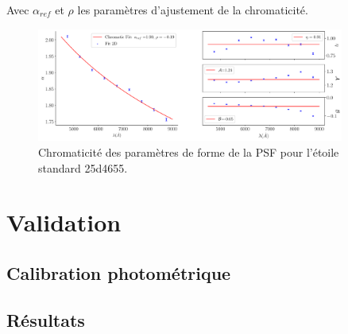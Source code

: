 \documentclass[../main/main.tex]{subfiles}
\begin{document}
Avec $\alpha_{ref}$ et $\rho$ les paramètres d'ajustement de la chromaticité.

\begin{figure}
  \centering
  \includegraphics[width=0.9\textwidth]{../figures/06_irf/chromaticity_psf.pdf}
  \caption[Chromaticité des paramètres de forme de la PSF]{Chromaticité
    des paramètres de forme de la PSF pour l'étoile standard 25d4655.}
  \label{fig:chromaticity_psf}
\end{figure}


\clearpage
\section{Validation}\label{sec:validationpsf}

\subsection{Calibration photométrique}\label{ssec:photocalibstd}

\subsection{Résultats}\label{ssec:resultscalib}




\end{document}
